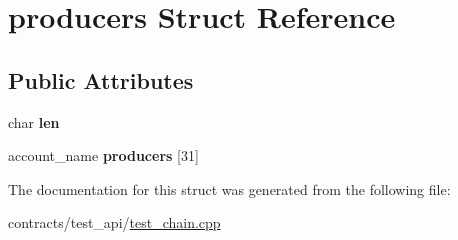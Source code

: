 \hypertarget{structproducers}{}\section{producers Struct Reference}
\label{structproducers}
\subsection*{Public Attributes}
\begin{DoxyCompactItemize}
\item 
\mbox{\label{structproducers_a68755b19eab5e9f1c229ae898b199c10}} 
char {\bfseries len}
\item 
\mbox{\label{structproducers_a4ea35161eb14f6a2bad24db1ff640554}} 
account\+\_\+name {\bfseries producers} \mbox{[}31\mbox{]}
\end{DoxyCompactItemize}


The documentation for this struct was generated from the following file\+:\begin{DoxyCompactItemize}
\item 
contracts/test\+\_\+api/\mbox{\hyperlink{test__chain_8cpp}{test\+\_\+chain.\+cpp}}\end{DoxyCompactItemize}
